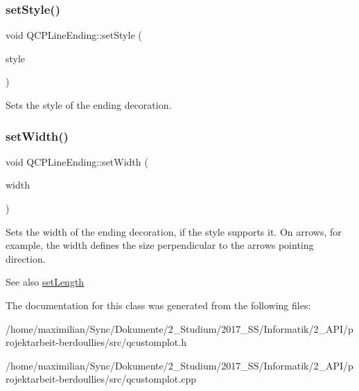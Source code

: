 \subsubsection{\texorpdfstring{set\+Style()}{setStyle()}}
{\footnotesize\ttfamily void Q\+C\+P\+Line\+Ending\+::set\+Style (\begin{DoxyParamCaption}\item[{\hyperlink{class_q_c_p_line_ending_a5ef16e6876b4b74959c7261d8d4c2cd5}{Q\+C\+P\+Line\+Ending\+::\+Ending\+Style}}]{style }\end{DoxyParamCaption})}

Sets the style of the ending decoration. \mbox{\label{class_q_c_p_line_ending_a26dc020ea985a72cc25881ce2115e34e}} 
\subsubsection{\texorpdfstring{set\+Width()}{setWidth()}}
{\footnotesize\ttfamily void Q\+C\+P\+Line\+Ending\+::set\+Width (\begin{DoxyParamCaption}\item[{double}]{width }\end{DoxyParamCaption})}

Sets the width of the ending decoration, if the style supports it. On arrows, for example, the width defines the size perpendicular to the arrow\textquotesingle{}s pointing direction.

\begin{DoxySeeAlso}{See also}
\hyperlink{class_q_c_p_line_ending_ae36fa01763751cd64b7f56c3507e935a}{set\+Length} 
\end{DoxySeeAlso}


The documentation for this class was generated from the following files\+:\begin{DoxyCompactItemize}
\item 
/home/maximilian/\+Sync/\+Dokumente/2\+\_\+\+Studium/2017\+\_\+\+S\+S/\+Informatik/2\+\_\+\+A\+P\+I/projektarbeit-\/berdoullies/src/qcustomplot.\+h\item 
/home/maximilian/\+Sync/\+Dokumente/2\+\_\+\+Studium/2017\+\_\+\+S\+S/\+Informatik/2\+\_\+\+A\+P\+I/projektarbeit-\/berdoullies/src/qcustomplot.\+cpp\end{DoxyCompactItemize}
